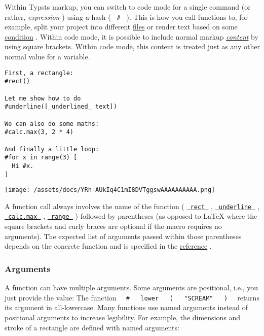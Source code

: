 Within Typst\textquotesingle s markup, you can switch to code mode for a
single command (or rather, \emph{expression} ) using a hash (
\texttt{\ \#\ } ). This is how you call functions to, for example, split
your project into different
\href{/docs/reference/scripting/\#modules}{files} or render text based
on some \href{/docs/reference/scripting/\#conditionals}{condition} .
Within code mode, it is possible to include normal markup
\href{/docs/reference/foundations/content/}{\emph{content}} by using
square brackets. Within code mode, this content is treated just as any
other normal value for a variable.

\begin{verbatim}
First, a rectangle:
#rect()

Let me show how to do
#underline([_underlined_ text])

We can also do some maths:
#calc.max(3, 2 * 4)

And finally a little loop:
#for x in range(3) [
  Hi #x.
]
\end{verbatim}

\texttt{[image: /assets/docs/YRh-AUkIq4C1mI8DVTggswAAAAAAAAAA.png]}

A function call always involves the name of the function (
\href{/docs/reference/visualize/rect/}{\texttt{\ rect\ }} ,
\href{/docs/reference/text/underline/}{\texttt{\ underline\ }} ,
\href{/docs/reference/foundations/calc/\#functions-max}{\texttt{\ calc.max\ }}
,
\href{/docs/reference/foundations/array/\#definitions-range}{\texttt{\ range\ }}
) followed by parentheses (as opposed to LaTeX where the square brackets
and curly braces are optional if the macro requires no arguments). The
expected list of arguments passed within those parentheses depends on
the concrete function and is specified in the
\href{/docs/reference/}{reference} .

\subsubsection{Arguments}\label{arguments}

A function can have multiple arguments. Some arguments are positional,
i.e., you just provide the value: The function
\texttt{\ }{\texttt{\ \#\ }}\texttt{\ }{\texttt{\ lower\ }}\texttt{\ }{\texttt{\ (\ }}\texttt{\ }{\texttt{\ "SCREAM"\ }}\texttt{\ }{\texttt{\ )\ }}\texttt{\ }
returns its argument in all-lowercase. Many functions use named
arguments instead of positional arguments to increase legibility. For
example, the dimensions and stroke of a rectangle are defined with named
arguments:

